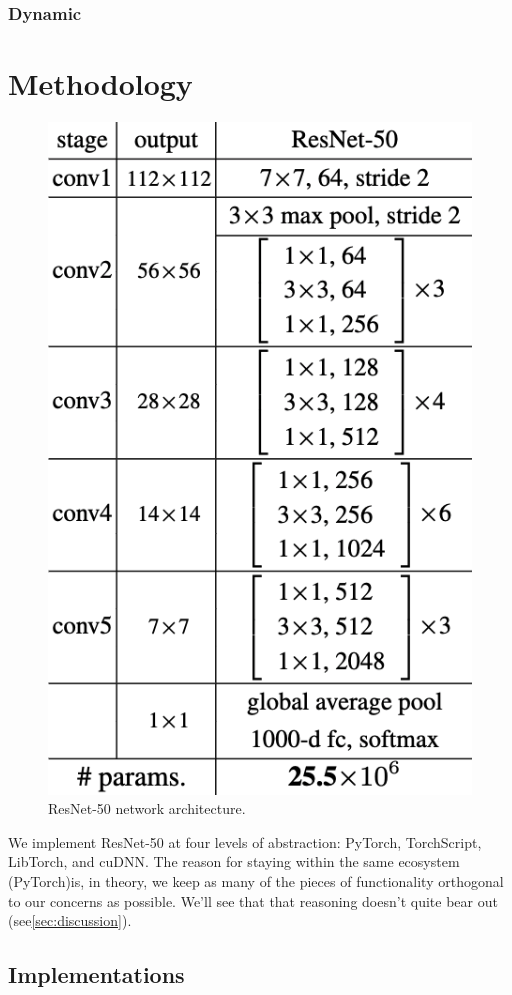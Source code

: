 \documentclass[sigconf]{acmart}
\begin{document}
\subsubsection{Dynamic}

\section{Methodology}\label{sec:methodology}

\begin{figure}
  \includegraphics[width=.7\linewidth]{figures/resnet50.png}
  \caption{ResNet-50 network architecture\cite{he2015deep}.}
  \label{fig:resnet}
\end{figure}

We implement ResNet-50 at four levels of abstraction: PyTorch, TorchScript, LibTorch, and cuDNN.
The reason for staying within the same ecosystem (PyTorch)is, in theory, we keep as many of the pieces of functionality orthogonal to our concerns as possible.
We'll see that that reasoning doesn't quite bear out (see\ref{sec:discussion}).

\subsection{Implementations}\label{subsec:implementations}
\end{document}
